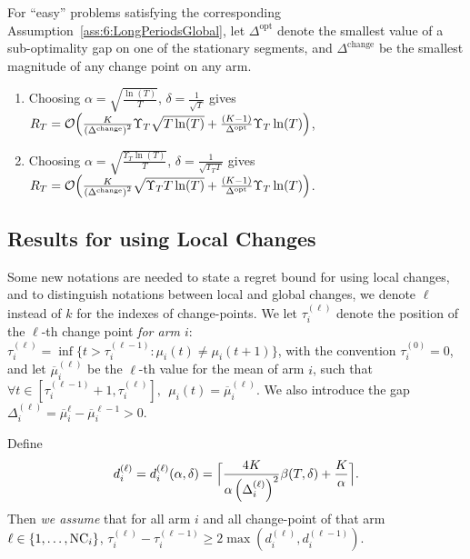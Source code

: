\begin{corollary}\label{cor:6:Global}
    For ``easy'' problems satisfying the corresponding Assumption~\ref{ass:6:LongPeriodsGlobal},
    let $\Delta^{\text{opt}}$ denote the smallest value of a sub-optimality gap on one of the stationary segments, and $\Delta^{\text{change}}$ be the smallest magnitude of any change point on any arm.
    \begin{enumerate}
        \item Choosing $\alpha = \sqrt{\frac{\ln(T)}{T}}$, $\delta = \frac{1}{\sqrt{T}}$ gives $R_T = \mathop{}\mathopen{}\mathcal{O}\mathopen{}\left(\frac{K}{\left(\Delta^{\text{change}}\right)^2} \Upsilon_T\sqrt{T\ln(T)} + \frac{(K-1)}{\Delta^{\text{opt}}} \Upsilon_T\ln(T)\right)$,
        \item Choosing $\alpha = \sqrt{\frac{\Upsilon_T\ln(T)}{T}}$, $\delta = \frac{1}{\sqrt{\Upsilon_T T}}$ gives $R_T = \mathop{}\mathopen{}\mathcal{O}\mathopen{}\left(\frac{K}{\left(\Delta^{\text{change}}\right)^2}\sqrt{\Upsilon_T T \ln(T)} + \frac{(K-1)}{\Delta^{\text{opt}}} \Upsilon_T\ln(T)\right)$.
    \end{enumerate}
\end{corollary}


\subsection{Results for \GLRklUCB{} using Local Changes}

Some new notations are needed to state a regret bound for \GLRklUCB{} using local changes,
and to distinguish notations between local and global changes, we denote $\ell$ instead of $k$ for the indexes of change-points.
We let $\tau_i^{(\ell)}$ denote the position of the $\ell$-th change point \emph{for arm $i$}: $\tau_i^{(\ell)} = \inf \{ t > \tau_i^{(\ell - 1)} : \mu_i(t) \neq \mu_i(t+1)\}$,
with the convention $\tau_i^{(0)}=0$, and let $\overline{\mu}_i^{(\ell)}$ be the $\ell$-th value for the mean of arm $i$, such that $\forall t \in [\tau_i^{(\ell-1)}+1, \tau_i^{(\ell)}], \ \ \mu_i(t) = \overline{\mu}_i^{(\ell)}$.
We also introduce the gap $\Delta_i^{(\ell)} = \overline{\mu}_i^{\ell} - \overline{\mu}_i^{\ell-1} > 0$.

\begin{assumption}
    \label{ass:6:LongPeriods}
    Define
    \begin{equation}\label{def:6:DelayLocal}
        d_i^{(\ell)} = d_i^{(\ell)}(\alpha,\delta) = \Bigl\lceil \frac{4K}{\alpha\left(\Delta_i^{(\ell)}\right)^2}\beta(T,\delta) + \frac{K}{\alpha} \Bigr\rceil.
    \end{equation}
    Then \emph{we assume} that for all arm $i$ and all change-point of that arm $\ell \in \{1,\dots,\text{NC}_i\}$, $\tau_i^{(\ell)} - \tau_i^{(\ell-1)} \geq 2\max (d_i^{(\ell)},d_i^{(\ell-1)})$.
\end{assumption}

